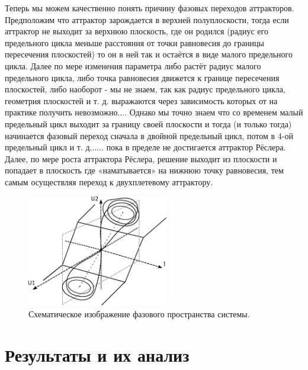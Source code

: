 \documentclass[12pt]{article}
\begin{document}
Теперь мы можем качественно понять причину фазовых переходов аттракторов. Предположим что аттрактор зарождается в верхней полуплоскости, тогда если аттрактор  не выходит за верхнюю плоскость, где он родился (радиус его предельного цикла меньше расстояния от точки равновесия до границы пересечения плоскостей) то он в ней так и остаётся в виде малого предельного цикла. Далее по мере изменения параметра либо растёт радиус малого предельного цикла, либо точка равновесия движется к границе пересечения плоскостей, либо наоборот - мы не знаем, так как радиус предельного цикла, геометрия плоскостей и т. д. выражаются через зависимость которых от на практике получить невозможно.... Однако мы точно знаем что со временем малый предельный цикл выходит за границу своей плоскости и тогда (и только тогда) начинается фазовый переход сначала в двойной предельный цикл, потом в 4-ой предельный цикл и т. д...... пока в пределе не достигается аттрактор Рёслера. Далее, по мере роста аттрактора Рёслера, решение выходит из плоскости и попадает в плоскость где «наматывается» на нижнюю точку равновесия, тем самым осуществляя переход к двухплетевому аттрактору.
\begin{figure}[H]
	\centering
	\includegraphics[width=0.55\textwidth]{Kartinka.pdf}
	\caption{Схематическое изображение фазового пространства системы.}
	\label{fig:kartinka}
\end{figure}

\section*{Результаты и их анализ}
\end{document}
